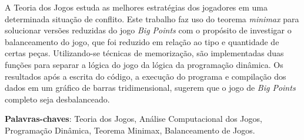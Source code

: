 \begin{resumo}

A Teoria dos Jogos estuda as melhores estratégias dos jogadores em uma determinada situação de conflito.
Este trabalho faz uso do teorema \emph{minimax} para solucionar versões reduzidas do jogo \emph{Big Points} com o propósito de investigar o balanceamento do jogo, que foi reduzido em relação ao tipo e quantidade de certas peças.
Utilizando-se técnicas de memorização, são implementadas duas funções para separar a lógica do jogo da lógica da programação dinâmica.
Os resultados após a escrita do código, a execução do programa e compilação dos dados em um gráfico de barras tridimensional, sugerem que o jogo de \emph{Big Points} completo seja desbalanceado.

 \vspace{\onelineskip}

 \noindent
 \textbf{Palavras-chaves}: Teoria dos Jogos, Análise Computacional dos Jogos, Programação Dinâmica, Teorema Minimax, Balanceamento de Jogos.
\end{resumo}

